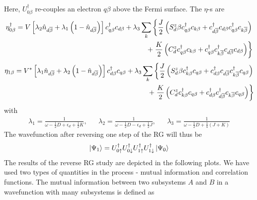 \documentclass[12pt,twoside]{report}
\numberwithin{equation}{section}
\begin{document}
Here, \(U^\dagger_{0\beta}\) re-couples an electron \(q\beta\) above the Fermi surface. The \(\eta\)-s are
\begin{equation}\begin{aligned}
	\eta_{0\beta}^\dagger = V \left[\lambda_2 \hat n_{d\overline\beta} + \lambda_1 \left( 1 - \hat n_{d\overline\beta} \right)  \right]c^\dagger_{q\beta}c_{d\beta} + \lambda_3 \sum_{k} \left\{ \frac{J}{2}\left( S_d^z \beta c^\dagger_{q\beta}c_{k\beta} + c^\dagger_{d\overline\beta}c_{d\beta}c^\dagger_{q\beta}c_{k\overline\beta}\right) \right.\\
	+ \left.\frac{K}{2}\left( C^z_d c^\dagger_{q\beta}c_{k\beta} + c^\dagger_{q\beta}c^\dagger_{k\overline\beta}c_{d\overline\beta}c_{d\beta} \right) \right\} \\
\end{aligned}\end{equation}
\begin{equation}\begin{aligned}
	\eta_{1\beta} = V^* \left[\lambda_1 \hat n_{d\overline\beta} + \lambda_2 \left( 1 - \hat n_{d\overline\beta} \right)  \right]c^\dagger_{d\beta}c_{q\beta} + \lambda_3 \sum_{k} \left\{ \frac{J}{2}\left( S_d^z \beta c^\dagger_{k\beta}c_{q\beta} + c^\dagger_{d\beta}c_{d\overline\beta}c^\dagger_{k\overline\beta}c_{q\beta}\right) \right.\\
	+ \left.\frac{K}{2}\left( C^z_d c^\dagger_{k\beta}c_{q\beta} + c^\dagger_{d\beta}c^\dagger_{d\overline\beta}c_{k\overline\beta}c_{q\beta} \right) \right\} \\
\end{aligned}\end{equation}
with
\begin{equation}\begin{aligned}
	\lambda_1 = \frac{1}{\omega - \frac{1}{2}D + \epsilon_d + \frac{1}{2}K}, && \lambda_2 = \frac{1}{\omega - \frac{1}{2}D - \epsilon_d + \frac{1}{2}J}, && \lambda_3 = \frac{1}{\omega - \frac{1}{2}D + \frac{1}{4}\left(J + K\right)} 
\end{aligned}\end{equation}
The wavefunction after reversing one step of the RG will thus be
\begin{equation}\begin{aligned}
	\ket{\Psi_1} = U^\dagger_{0 \uparrow}U^\dagger_{0 \downarrow}U^\dagger_{1 \uparrow}U^\dagger_{1 \downarrow}\ket{\Psi_0}
\end{aligned}\end{equation}
The results of the reverse RG study are depicted in the following plots. We have used two types of quantities in the process - mutual information and correlation functions. The mutual information between two subsystems \(A\) and \(B\) in a wavefunction with many subsystems is defined as
\end{document}

